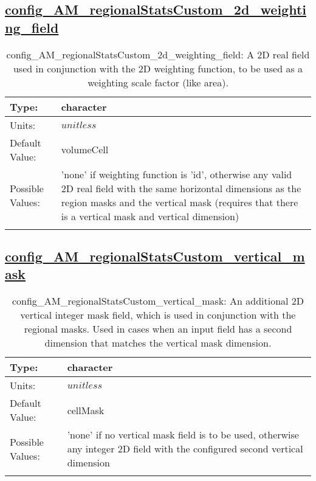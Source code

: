 \subsection[config\_AM\_regionalStatsCustom\_2d\_weighting\_field]{\hyperref[sec:nm_tab_AM_regionalStatsCustom]{config\_AM\_regionalStatsCustom\_2d\_weighting\_field}}
\label{subsec:nm_sec_config_AM_regionalStatsCustom_2d_weighting_field}
\begin{center}
\begin{longtable}{| p{2.0in} || p{4.0in} |}
    \hline
    Type: & character \\
    \hline
    Units: & $unitless$ \\
    \hline
    Default Value: & volumeCell \\
    \hline
    Possible Values: & 'none' if weighting function is 'id', otherwise any valid 2D real field with the same horizontal dimensions as the region masks and the vertical mask (requires that there is a vertical mask and vertical dimension) \\
    \hline
    \caption{config\_AM\_regionalStatsCustom\_2d\_weighting\_field: A 2D real field used in conjunction with the 2D weighting function, to be used as a weighting scale factor (like area).}
\end{longtable}
\end{center}
\subsection[config\_AM\_regionalStatsCustom\_vertical\_mask]{\hyperref[sec:nm_tab_AM_regionalStatsCustom]{config\_AM\_regionalStatsCustom\_vertical\_mask}}
\label{subsec:nm_sec_config_AM_regionalStatsCustom_vertical_mask}
\begin{center}
\begin{longtable}{| p{2.0in} || p{4.0in} |}
    \hline
    Type: & character \\
    \hline
    Units: & $unitless$ \\
    \hline
    Default Value: & cellMask \\
    \hline
    Possible Values: & 'none' if no vertical mask field is to be used, otherwise any integer 2D field with the configured second vertical dimension \\
    \hline
    \caption{config\_AM\_regionalStatsCustom\_vertical\_mask: An additional 2D vertical integer mask field, which is used in conjunction with the regional masks. Used in cases when an input field has a second dimension that matches the vertical mask dimension.}
\end{longtable}
\end{center}
